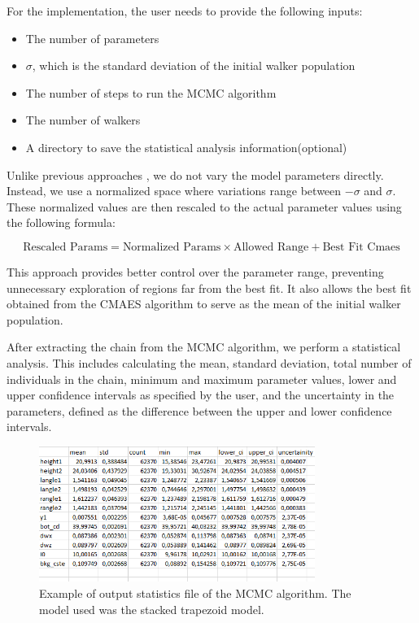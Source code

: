 \medskip

For the implementation, the user needs to provide the following inputs:
\begin{itemize}
    \item The number of parameters
    \item $\sigma$, which is the standard deviation of the initial walker population
    \item The number of steps to run the MCMC algorithm
    \item The number of walkers
    \item A directory to save the statistical analysis information(optional)
\end{itemize}

\medskip

Unlike previous approaches \cite{sunday2016evaluation}, we do not vary the model parameters directly. Instead, we use a normalized space where variations range between $-\sigma$ and $\sigma$. These normalized values are then rescaled to the actual parameter values using the following formula:

\begin{equation}
    \text{Rescaled Params} = \text{Normalized Params} \times \text{Allowed Range} + \text{Best Fit Cmaes}
\end{equation}

This approach provides better control over the parameter range, preventing unnecessary exploration of regions far from the best fit. It also allows the best fit obtained from the CMAES algorithm to serve as the mean of the initial walker population.

\medskip

After extracting the chain from the MCMC algorithm, we perform a statistical analysis. This includes calculating the mean, standard deviation, total number of individuals in the chain, minimum and maximum parameter values, lower and upper confidence intervals as specified by the user, and the uncertainty in the parameters, defined as the difference between the upper and lower confidence intervals.

\begin{figure}[h]
    \centering
    \includegraphics[width=0.8\textwidth]{images/mcmc_out.png}
    \caption{Example of output statistics file of the MCMC algorithm. The model used was the stacked trapezoid model.}
\end{figure}

